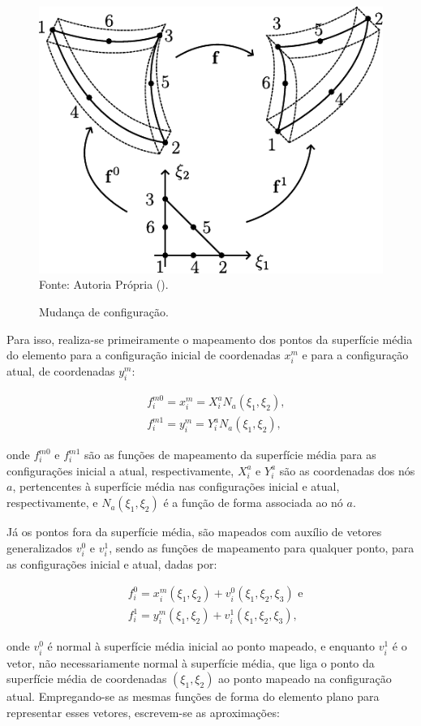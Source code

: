 \begin{figure}[h!]
    \centering
    \caption{Mudança de configuração.}
    \includegraphics[width=.4\linewidth]{Figuras/Mapeamento.pdf}
    \\Fonte: Autoria Própria (\the\year).
    \label{fig:Mapeamento}
\end{figure}

Para isso, realiza-se primeiramente o mapeamento dos pontos da superfície média do elemento para a configuração inicial de coordenadas $x_i^m$ e para a configuração atual, de coordenadas $y_i^m$:

\begin{subequations}
    \begin{align}
         & f_i^{m0}=x_i^m=X_i^aN_a(\xi_1,\xi_2)\text{,} \\
         & f_i^{m1}=y_i^m=Y_i^aN_a(\xi_1,\xi_2)\text{,}
    \end{align}
\end{subequations}

\noindent onde $f_i^{m0}$ e $f_i^{m1}$ são as funções de mapeamento da superfície média para as configurações inicial a atual, respectivamente, $X_i^a$ e $Y_i^a$ são as coordenadas dos nós $a$, pertencentes à superfície média nas configurações inicial e atual, respectivamente, e $N_a(\xi_1,\xi_2)$ é a função de forma associada ao nó $a$.

Já os pontos fora da superfície média, são mapeados com auxílio de vetores generalizados $v_i^0$ e $v_i^1$, sendo as funções de mapeamento para qualquer ponto, para as configurações inicial e atual, dadas por:

\begin{subequations}
    \begin{align}
         & f_i^0=x_i^m(\xi_1,\xi_2)+v_i^0(\xi_1,\xi_2,\xi_3)\text{ e} \\
         & f_i^1=y_i^m(\xi_1,\xi_2)+v_i^1(\xi_1,\xi_2,\xi_3)\text{,}
    \end{align}
\end{subequations}

\noindent onde $v_i^0$ é normal à superfície média inicial ao ponto mapeado, e enquanto $v_i^1$ é o vetor, não necessariamente normal à superfície média, que liga o ponto da superfície média de coordenadas $(\xi_1,\xi_2)$ ao ponto mapeado na configuração atual. Empregando-se as mesmas funções de forma do elemento plano para representar esses vetores, escrevem-se as aproximações:


